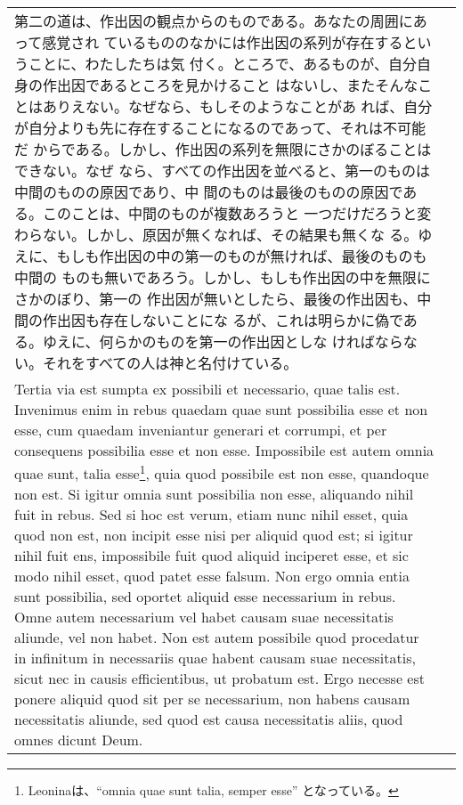 \documentclass[10pt]{jsarticle}
\begin{document}
\begin{longtable}{p{21em}p{21em}}
第二の道は、作出因の観点からのものである。あなたの周囲にあって感覚され
ているもののなかには作出因の系列が存在するということに、わたしたちは気
付く。ところで、あるものが、自分自身の作出因であるところを見かけること
はないし、またそんなことはありえない。なぜなら、もしそのようなことがあ
れば、自分が自分よりも先に存在することになるのであって、それは不可能だ
からである。しかし、作出因の系列を無限にさかのぼることはできない。なぜ
なら、すべての作出因を並べると、第一のものは中間のものの原因であり、中
間のものは最後のものの原因である。このことは、中間のものが複数あろうと
一つだけだろうと変わらない。しかし、原因が無くなれば、その結果も無くな
る。ゆえに、もしも作出因の中の第一のものが無ければ、最後のものも中間の
ものも無いであろう。しかし、もしも作出因の中を無限にさかのぼり、第一の
作出因が無いとしたら、最後の作出因も、中間の作出因も存在しないことにな
るが、これは明らかに偽である。ゆえに、何らかのものを第一の作出因としな
ければならない。それをすべての人は神と名付けている。



\\

Tertia via est sumpta ex possibili et necessario, quae talis
est. Invenimus enim in rebus quaedam quae sunt possibilia esse et non
esse, cum quaedam inveniantur generari et corrumpi, et per consequens
possibilia esse et non esse. Impossibile est autem omnia quae sunt,
talia esse\footnote{Leoninaは、``omnia quae sunt talia, semper esse''
となっている。}, quia quod possibile est non esse, quandoque non
est. Si igitur omnia sunt possibilia non esse, aliquando nihil fuit in
rebus. Sed si hoc est verum, etiam nunc nihil esset, quia quod non
est, non incipit esse nisi per aliquid quod est; si igitur nihil fuit
ens, impossibile fuit quod aliquid inciperet esse, et sic modo nihil
esset, quod patet esse falsum. Non ergo omnia entia sunt possibilia,
sed oportet aliquid esse necessarium in rebus. Omne autem necessarium
vel habet causam suae necessitatis aliunde, vel non habet. Non est
autem possibile quod procedatur in infinitum in necessariis quae
habent causam suae necessitatis, sicut nec in causis efficientibus, ut
probatum est. Ergo necesse est ponere aliquid quod sit per se
necessarium, non habens causam necessitatis aliunde, sed quod est
causa necessitatis aliis, quod omnes dicunt Deum.


& 



\end{longtable}
\end{document}
